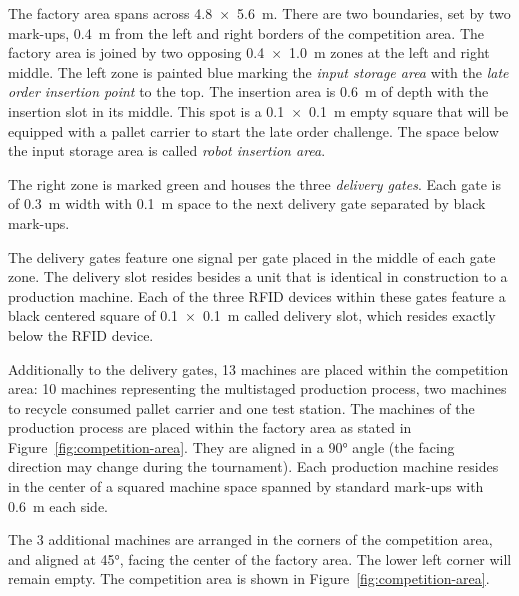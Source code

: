 \documentclass[12pt,twoside]{article}
\begin{document}
The factory area spans across \SI{4.8 x 5.6}{\metre}. There are two
boundaries, set by two mark-ups, \SI{0.4}{\metre} from the left and
right borders of the competition area. The factory area is joined by
two opposing \SI{0.4 x 1.0}{\metre} zones at the left and right
middle. The left zone is painted blue marking the \textit{input
  storage area} with the \textit{late order insertion point} to the
top. The insertion area is \SI{0.6}{\metre} of depth with the
insertion slot in its middle. This spot is a \SI{0.1 x 0.1}{\metre}
empty square that will be equipped with a pallet carrier to start the
late order challenge. The space below the input storage area is called
\textit{robot insertion area}.

The right zone is marked green and houses the three \textit{delivery
  gates}.  Each gate is of \SI{0.3}{\metre} width with
\SI{0.1}{\metre} space to the next delivery gate separated by black
mark-ups.

The delivery gates feature one signal per gate placed in the middle of
each gate zone. The delivery slot resides besides a unit that is
identical in construction to a production machine. Each of the three
RFID devices within these gates feature a black centered square of
\SI{0.1 x 0.1}{\metre} called delivery slot, which resides exactly
below the RFID device.

Additionally to the delivery gates, 13 machines are placed within the
competition area: 10 machines representing the multistaged production
process, two machines to recycle consumed pallet carrier and one test
station. The machines of the production process are placed within the
factory area as stated in Figure~\ref{fig:competition-area}. They are
aligned in a \ang{90} angle (the facing direction may change during
the tournament). Each production machine resides in the center of a
squared machine space spanned by standard mark-ups with
\SI{0.6}{\metre} each side.

The 3 additional machines are arranged in the corners of the
competition area, and aligned at \ang{45}, facing the center of the
factory area. The lower left corner will remain empty. The competition
area is shown in Figure~\ref{fig:competition-area}.
\end{document}
